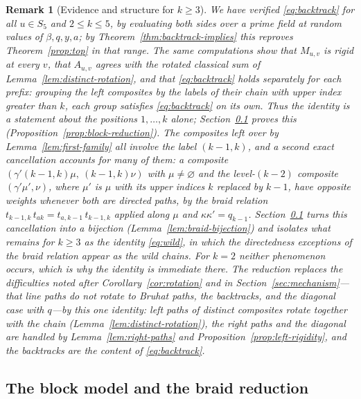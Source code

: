 \documentclass[11pt]{article}
\newtheorem{remark}[proposition]{Remark}
\begin{document}
\begin{remark}[Evidence and structure for $k\geq3$]
\label{rem:backtrack-evidence}
We have verified \eqref{eq:backtrack} for all $u\in S_5$ and
$2\leq k\leq5$, by evaluating both sides over a prime field at random
values of $\beta,q,y,a$; by Theorem~\ref{thm:backtrack-implies} this
reproves Theorem~\ref{prop:top} in that range. The same computations
show that $M_{u,v}$ is rigid at every $v$, that $A_{u,v}$ agrees with
the rotated classical sum of Lemma~\ref{lem:distinct-rotation}, and
that \eqref{eq:backtrack} holds separately for each prefix: grouping
the left composites by the labels of their chain with upper index
greater than $k$, each group satisfies \eqref{eq:backtrack} on its own.
Thus the identity is a statement about the positions $1,\ldots,k$
alone; Section~\ref{sec:block} proves this
(Proposition~\ref{prop:block-reduction}). The composites left over by
Lemma~\ref{lem:first-family} all
involve the label $(k-1,k)$, and a second exact cancellation accounts
for many of them: a composite $(\gamma'(k-1,k)\mu,\ (k-1,k)\nu)$ with
$\mu\neq\varnothing$ and the level-$(k-2)$ composite $(\gamma'\mu',\nu)$,
where $\mu'$ is $\mu$ with its upper indices $k$ replaced by $k-1$,
have opposite weights whenever both are directed paths, by the braid
relation $t_{k-1,k}\,t_{ak}=t_{a,k-1}\,t_{k-1,k}$ applied along $\mu$
and $\kappa\kappa'=q_{k-1}$. Section~\ref{sec:block} turns this
cancellation into a bijection (Lemma~\ref{lem:braid-bijection}) and
isolates what remains for $k\geq3$ as the identity \eqref{eq:wild},
in which the directedness exceptions of the braid relation appear as
the wild chains. For $k=2$
neither phenomenon occurs, which is why the identity is immediate
there. The reduction replaces the difficulties noted after
Corollary~\ref{cor:rotation} and in Section~\ref{sec:mechanism}---that
line paths do not rotate to Bruhat paths, the backtracks, and the
diagonal case with $q$---by this one identity: left paths of distinct
composites rotate together with the chain
(Lemma~\ref{lem:distinct-rotation}), the right paths and the diagonal
are handled by Lemma~\ref{lem:right-paths} and
Proposition~\ref{prop:left-rigidity}, and the backtracks are the
content of \eqref{eq:backtrack}.
\end{remark}

\subsection{The block model and the braid reduction}
\label{sec:block}
\end{document}
